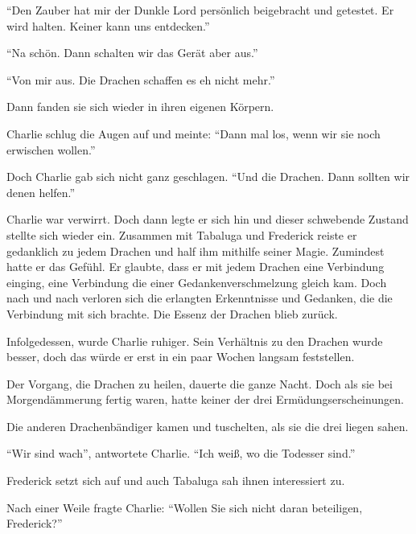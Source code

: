\enquote{Den Zauber hat mir der Dunkle Lord persönlich beigebracht und getestet. Er wird halten. Keiner kann uns entdecken.}

\enquote{Na schön. Dann schalten wir das Gerät aber aus.}

\enquote{Von mir aus. Die Drachen schaffen es eh nicht mehr.}

Dann fanden sie sich wieder in ihren eigenen Körpern.

Charlie schlug die Augen auf und meinte: \enquote{Dann mal los, wenn wir sie noch erwischen wollen.}


Doch Charlie gab sich nicht ganz geschlagen. \enquote{Und die Drachen. Dann sollten wir denen helfen.}






Charlie war verwirrt. Doch dann legte er sich hin und dieser schwebende Zustand stellte sich wieder ein. Zusammen mit Tabaluga und Frederick reiste er gedanklich zu jedem Drachen und half ihm mithilfe seiner Magie. Zumindest hatte er das Gefühl. Er glaubte, dass er mit jedem Drachen eine Verbindung einging, eine Verbindung die einer Gedankenverschmelzung gleich kam. Doch nach und nach verloren sich die erlangten Erkenntnisse und Gedanken, die die Verbindung mit sich brachte. Die Essenz der Drachen blieb zurück.

Infolgedessen, wurde Charlie ruhiger. Sein Verhältnis zu den Drachen wurde besser, doch das würde er erst in ein paar Wochen langsam feststellen.

Der Vorgang, die Drachen zu heilen, dauerte die ganze Nacht. Doch als sie bei Morgendämmerung fertig waren, hatte keiner der drei Ermüdungserscheinungen.

Die anderen Drachenbändiger kamen und tuschelten, als sie die drei liegen sahen.

\enquote{Wir sind wach}, antwortete Charlie. \enquote{Ich weiß, wo die Todesser sind.}

Frederick setzt sich auf und auch Tabaluga sah ihnen interessiert zu.

Nach einer Weile fragte Charlie: \enquote{Wollen Sie sich nicht daran beteiligen, Frederick?}

